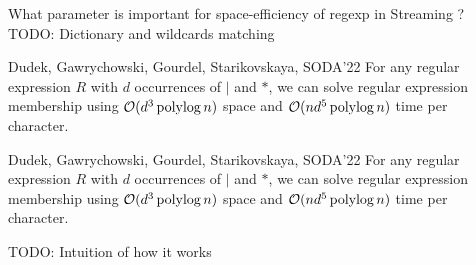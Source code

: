 \begin{frame}{What parameter is important for space-efficiency of regexp in Streaming ?}
    TODO: Dictionary and wildcards matching 

    \begin{myalertblock}{Dudek, Gawrychowski, Gourdel, Starikovskaya, SODA'22}
        For any regular expression $R$ with $d$ occurrences of $|$ and $\ast$, we can solve regular expression membership using $\mathcal{O}(d^{3}\operatorname{polylog} n)$ space and $\mathcal{O}(nd^{5}\operatorname{polylog} n)$ time per character.
    \end{myalertblock}
\end{frame}

\begin{frame}{}

    \begin{myalertblock}{Dudek, Gawrychowski, Gourdel, Starikovskaya, SODA'22}
        For any regular expression $R$ with $d$ occurrences of $|$ and $\ast$, we can solve regular expression membership using $\mathcal{O}(d^{3}\operatorname{polylog} n)$ space and $\mathcal{O}(nd^{5}\operatorname{polylog} n)$ time per character.
    \end{myalertblock}
    TODO: Intuition of how it works  
\end{frame}